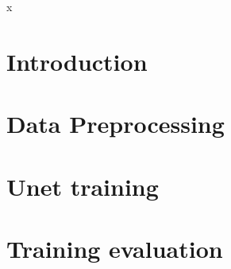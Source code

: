 \documentclass[twoside,12pt]{report}
\begin{document}



\newpage
\thispagestyle{empty}\null\newpage



x
\tableofcontents

\thispagestyle{empty}\null\newpage

\chapter{Introduction}

\chapter{Data Preprocessing}

\chapter{Unet training}

\chapter{Training evaluation}

{}

\end{document}
